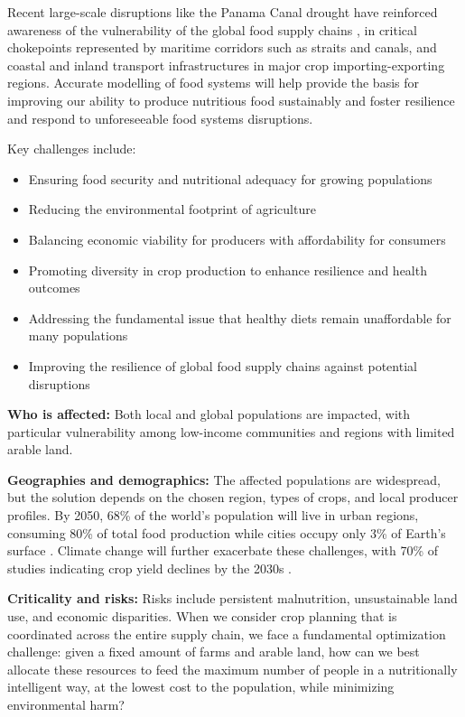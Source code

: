 \documentclass{oqireport}
\begin{document}
Recent large-scale disruptions like the Panama Canal drought have reinforced awareness of the vulnerability of the global food supply chains \cite{Nelson2021}, in critical chokepoints represented by maritime corridors such as straits and canals, and coastal and inland transport infrastructures in major crop importing-exporting regions. Accurate modelling of food systems will help provide the basis for improving our ability to produce nutritious food sustainably and foster resilience and respond to unforeseeable food systems disruptions.

Key challenges include:
\begin{itemize}
    \item Ensuring food security and nutritional adequacy for growing populations
    \item Reducing the environmental footprint of agriculture
    \item Balancing economic viability for producers with affordability for consumers
    \item Promoting diversity in crop production to enhance resilience and health outcomes
    \item Addressing the fundamental issue that healthy diets remain unaffordable for many populations
    \item Improving the resilience of global food supply chains against potential disruptions
\end{itemize}

\textbf{Who is affected:} Both local and global populations are impacted, with particular vulnerability among low-income communities and regions with limited arable land. 

\textbf{Geographies and demographics:} The affected populations are widespread, but the solution depends on the chosen region, types of crops, and local producer profiles. By 2050, 68\% of the world's population will live in urban regions, consuming 80\% of total food production while cities occupy only 3\% of Earth's surface \cite{ZOU2022100624}. Climate change will further exacerbate these challenges, with 70\% of studies indicating crop yield declines by the 2030s \cite{ZOU2022100624}.

\textbf{Criticality and risks:} Risks include persistent malnutrition, unsustainable land use, and economic disparities. When we consider crop planning that is coordinated across the entire supply chain, we face a fundamental optimization challenge: given a fixed amount of farms and arable land, how can we best allocate these resources to feed the maximum number of people in a nutritionally intelligent way, at the lowest cost to the population, while minimizing environmental harm?
\end{document}
